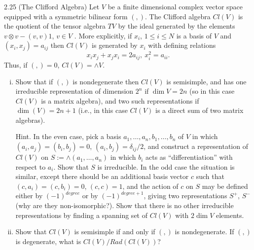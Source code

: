 \documentclass[twoside]{article}
\begin{document}
\begin{ejercicio}{2.25 (The Clifford Algebra)}
Let $V$ be a finite dimensional complex vector space
equipped with a symmetric bilinear form $(, )$. The Clifford algebra $Cl(V )$ is the quotient of the
tensor algebra $TV$ by the ideal generated by the elements $v ⊗ v −(v, v)1$, $v ∈ V$ . More explicitly, if
$x_i$, $1 ≤ i ≤ N$ is a basis of $V$ and $(x_i, x_j) = a_{ij}$ then $Cl(V )$ is generated by $x_i$ with defining relations
$$x_ix_j + x_jx_i = 2a_{ij} ,\ x^2_i = a_{ii}.$$
Thus, if $(, ) = 0$, $Cl(V ) = ∧V $.

\begin{enumerate}[(i)]
\item Show that if $(, )$ is nondegenerate then $Cl(V )$ is semisimple, and has one irreducible representation
of dimension $2^n$ if $\dim V = 2n$ (so in this case $Cl(V )$ is a matrix algebra), and two such
representations if $\dim(V ) = 2n+1$ (i.e., in this case $Cl(V )$ is a direct sum of two matrix algebras).

Hint. In the even case, pick a basis $a_1, \dots, a_n, b_1,\dots , b_n$ of $V$ in which $(a_i, a_j) = (b_i, b_j) = 0$,
$(a_i, b_j) = δ_{ij}/2$, and construct a representation of $Cl(V )$ on $S := ∧(a_1, \dots, a_n)$ in which $b_i$ acts as
“differentiation” with respect to $a_i$. Show that $S$ is irreducible. In the odd case the situation is
similar, except there should be an additional basis vector $c$ such that $(c, a_i) = (c, b_i) = 0$, $(c, c) =
1$, and the action of $c$ on $S$ may be defined either by $(−1)^{degree}$ or by $(−1)^{degree+1}$, giving two
representations $S^+$, $S^−$ (why are they non-isomorphic?). Show that there is no other irreducible
representations by finding a spanning set of $Cl(V )$ with $2\dim V$ elements.

\item Show that $Cl(V )$ is semisimple if and only if $(, )$ is nondegenerate. If $(, )$ is degenerate, what
is $Cl(V )/Rad(Cl(V ))$?
\end{enumerate}
\end{ejercicio}
\begin{solucion}
\end{solucion}
\end{document}
